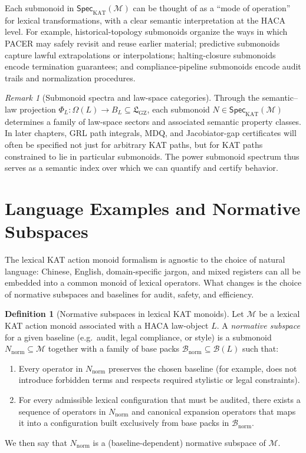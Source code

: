 \documentclass[11pt]{book}
\theoremstyle{plain}
\theoremstyle{definition}
\newtheorem{definition}[theorem]{Definition}
\theoremstyle{remark}
\newtheorem{remark}[theorem]{Remark}
\newcommand{\GZLS}{\ensuremath{\mathfrak{L}_{\mathrm{GZ}}}}       \newcommand{\GZLT}{\ensuremath{M_{!w}}}                           \newcommand{\GZLOC}{\ensuremath{A_M}}                             \newcommand{\GZLC}{\ensuremath{\omega_{\mathrm{law}}}}            \newcommand{\GZLCurv}{\ensuremath{\mathcal{F}_{\mathrm{law}}}}
\begin{document}
Each submonoid in $\mathsf{Spec}_{\mathrm{KAT}}(\mathcal{M})$ can be
thought of as a ``mode of operation'' for lexical transformations,
with a clear semantic interpretation at the HACA level. For example,
historical-topology submonoids organize the ways in which PACER may
safely revisit and reuse earlier material; predictive submonoids
capture lawful extrapolations or interpolations; halting-closure
submonoids encode termination guarantees; and compliance-pipeline
submonoids encode audit trails and normalization procedures.

\begin{remark}[Submonoid spectra and law-space categories]
\label{rem:submonoid-spectra-lawspace}
Through the semantic--law projection
$\Phi_L:\Omega(L)\to B_L\subseteq\GZLS$, each submonoid
$N\in\mathsf{Spec}_{\mathrm{KAT}}(\mathcal{M})$ determines a family of
law-space sectors and associated semantic property classes. In later
chapters, GRL path integrals, MDQ, and Jacobiator-gap certificates
will often be specified not just for arbitrary KAT paths, but for
KAT paths constrained to lie in particular submonoids. The power
submonoid spectrum thus serves as a semantic index over which we can
quantify and certify behavior.
\end{remark}

\section[Language Examples and Normative Subspaces]{Language Examples and Normative Subspaces}


The lexical KAT action monoid formalism is agnostic to the choice of
natural language: Chinese, English, domain-specific jargon, and mixed
registers can all be embedded into a common monoid of lexical
operators. What changes is the choice of normative subspaces and
baselines for audit, safety, and efficiency.

\begin{definition}[Normative subspaces in lexical KAT monoids]
\label{def:normative-subspace}
Let $\mathcal{M}$ be a lexical KAT action monoid associated with a
HACA law-object $L$. A \emph{normative subspace} for a given baseline
(e.g.\ audit, legal compliance, or style) is a submonoid
$N_{\mathrm{norm}}\subseteq\mathcal{M}$ together with a family of
base packs $\mathcal{B}_{\mathrm{norm}}\subseteq\mathcal{B}(L)$ such
that:
\begin{enumerate}
  \item Every operator in $N_{\mathrm{norm}}$ preserves the chosen
        baseline (for example, does not introduce forbidden terms and
        respects required stylistic or legal constraints).
  \item For every admissible lexical configuration that must be
        audited, there exists a sequence of operators in
        $N_{\mathrm{norm}}$ and canonical expansion operators that
        maps it into a configuration built exclusively from base
        packs in $\mathcal{B}_{\mathrm{norm}}$.
\end{enumerate}
We then say that $N_{\mathrm{norm}}$ is a (baseline-dependent)
normative subspace of $\mathcal{M}$.
\end{definition}
\end{document}
